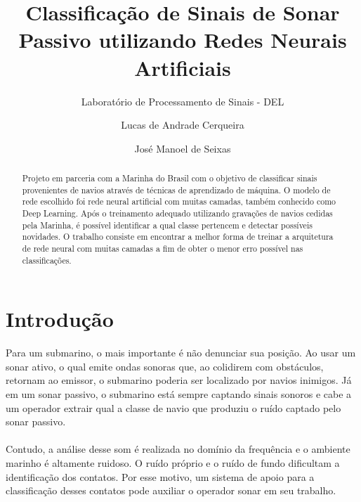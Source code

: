 \documentclass[]{report}
\title{\textbf{Classificação de Sinais de Sonar Passivo utilizando Redes Neurais Artificiais}}
\subtitle{Laboratório de Processamento de Sinais - DEL}
\author{Lucas de Andrade Cerqueira \and José Manoel de Seixas}
\begin{document}
\maketitle

\begin{abstract}
	Projeto em parceria com a Marinha do Brasil com o objetivo de classificar sinais provenientes de navios através de técnicas de aprendizado de máquina. O modelo de rede escolhido foi rede neural artificial com muitas camadas, também conhecido como Deep Learning. Após o treinamento adequado utilizando gravações de navios cedidas pela Marinha, é possível identificar a qual classe pertencem e detectar possíveis novidades. O trabalho consiste em encontrar a melhor forma de treinar a arquitetura de rede neural com muitas camadas a fim de obter o menor erro possível nas classificações.
\end{abstract}
\section*{Introdução}
	Para um submarino, o mais importante é não denunciar sua posição. Ao usar um sonar ativo, o qual emite ondas sonoras que, ao colidirem com obstáculos, retornam ao emissor, o submarino poderia ser localizado por navios inimigos. Já em um sonar passivo, o submarino está sempre captando sinais sonoros e cabe a um operador extrair qual a classe de navio que produziu o ruído captado pelo sonar passivo. \\\\
	Contudo, a análise desse som é realizada no domínio da frequência e o ambiente marinho é altamente ruidoso. O ruído próprio e o ruído de fundo dificultam a identificação dos contatos. Por esse motivo, um sistema de apoio para a classificação desses contatos pode auxiliar o operador sonar em seu trabalho.
	\vspace{1cm}
\end{document}
